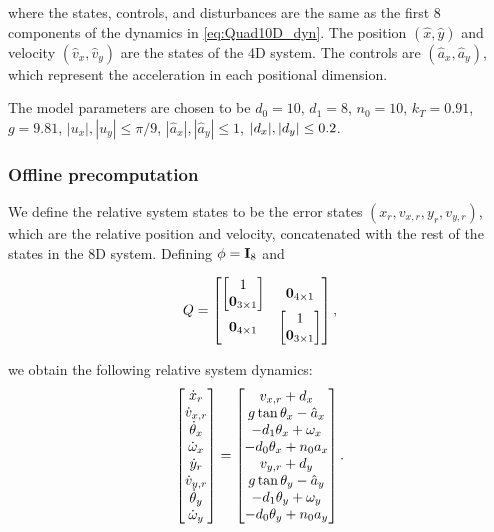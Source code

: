 \noindent where the states, controls, and disturbances are the same as the first 8 components of the dynamics in \eqref{eq:Quad10D_dyn}. 
The position $(\hat x,\hat y)$ and velocity $(\hat v_x, \hat v_y)$ are the states of the 4D system. 
The controls are $(\hat a_x, \hat a_y)$, which represent the acceleration in each positional dimension. 

The model parameters are chosen to be $d_0=10$, $d_1=8$, $n_0=10$, $k_T=0.91$, $g=9.81$, $|u_x|, |u_y| \le \pi/9$, $|\hat a_x|, |\hat a_y| \le 1$, $|d_x|, |d_y| \le 0.2$.

\subsubsection{Offline precomputation}
We define the relative system states to be the error states $(x_r, v_{x,r}, y_r, v_{y,r})$, which are the relative position and velocity, concatenated with the rest of the states in the 8D system.
Defining $\phi = \mathbf I_8$ and 

\begin{equation*}
Q = 
\begin{bmatrix}
  \begin{bmatrix} 1 \\ \mathbf 0_{3 \times 1} \end{bmatrix} 
    & \mathbf 0_{4\times 1} \\
  \mathbf 0_{4\times 1} 
    & \begin{bmatrix} 1 \\ \mathbf 0_{3 \times 1} \end{bmatrix} 
\end{bmatrix},
\end{equation*}

\noindent we obtain the following relative system dynamics:
\begin{equation}
\label{eq:Quad8DRel_dyn}
\begin{bmatrix}
\dot x_r\\
\dot v_{x,r}\\
\dot \theta_x\\
\dot \omega_x\\
\dot y_r\\
\dot v_{y,r}\\
\dot \theta_y\\
\dot \omega_y\\
\end{bmatrix} =
\begin{bmatrix}
v_{x,r} + \dstb_x\\
g \tan \theta_x - \hat a_x\\
-d_1 \theta_x + \omega_x\\
-d_0 \theta_x + n_0 a_x\\
v_{y,r} + \dstb_y\\
g \tan \theta_y - \hat a_y\\
-d_1 \theta_y + \omega_y\\
-d_0 \theta_y + n_0 a_y\\
\end{bmatrix}.
\end{equation}

